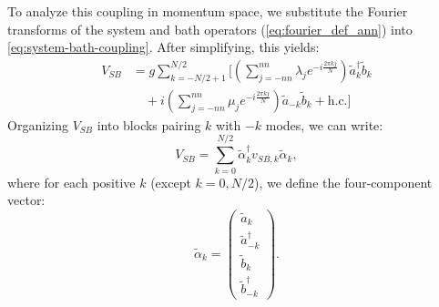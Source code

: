 To analyze this coupling in momentum space, we substitute the Fourier transforms of the system and bath operators (\cref{eq:fourier_def_ann}) into \cref{eq:system-bath-coupling}. After simplifying, this yields:
\begin{align}
    V_{SB} &= g \sum_{k=-N/2+1}^{N/2} \bigg[\left(\sum_{j=-nn}^{nn} \lambda_j e^{-i \frac{2\pi kj}{N}}\right) \tilde{a}_k^\dagger \tilde{b}_k\\
           &\quad + i\left(\sum_{j=-nn}^{nn} \mu_j e^{-i \frac{2\pi kj}{N}}\right) \tilde{a}_{-k} \tilde{b}_k + \text{h.c.}\bigg]
\end{align}
Organizing $V_{SB}$ into blocks pairing $k$ with $-k$ modes, we can write:
\begin{equation}
    V_{SB} = \sum_{k=0}^{N/2} \tilde{\alpha}_k^\dagger v_{SB,k} \tilde{\alpha}_k,
    \label{eq:app:HSBMomentum}
\end{equation}
where for each positive $k$ (except $k=0,N/2$), we define the four-component vector:
\begin{equation}
    \tilde{\alpha}_k = \begin{pmatrix}
        \tilde{a}_k\\
        \tilde{a}_{-k}^\dagger\\
        \tilde{b}_k\\
        \tilde{b}_{-k}^\dagger
    \end{pmatrix}.
\end{equation}



